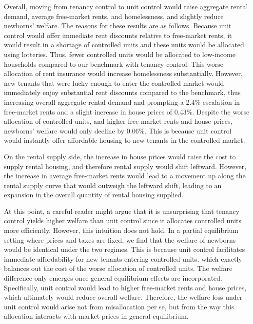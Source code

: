 \documentclass[parskip=full]{article}
\begin{document}
Overall, moving from tenancy control to unit control would raise aggregate rental demand, average free-market rents, and homelessness, and slightly reduce newborns' welfare. The reasons for these results are as follows. Because unit control would offer immediate rent discounts relative to free-market rents, it would result in a shortage of controlled units and these units would be allocated using lotteries. Thus, fewer controlled units would be allocated to low-income households compared to our benchmark with tenancy control. This worse allocation of rent insurance would increase homelessness substantially. However, new tenants that were lucky enough to enter the controlled market would immediately enjoy substantial rent discounts compared to the benchmark, thus increasing overall aggregate rental demand and prompting a 2.4\% escalation in free-market rents and a slight increase in house prices of 0.43\%. Despite the worse allocation of controlled units, and higher free-market rents and house prices, newborns' welfare would only decline by 0.06\%. This is because unit control would instantly offer affordable housing to new tenants in the controlled market. 

On the rental supply side, the increase in house prices would raise the cost to supply rental housing, and therefore rental supply would shift leftward. However, the increase in average free-market rents would lead to a movement up along the rental supply curve that would outweigh the leftward shift, leading to an expansion in the overall quantity of rental housing supplied.

At this point, a careful reader might argue that it is unsurprising that tenancy control yields higher welfare than unit control since it allocates controlled units more efficiently. However, this intuition does not hold. In a partial equilibrium setting where prices and taxes are fixed, we find that the welfare of newborns would be identical under the two regimes. This is because unit control facilitates immediate affordability for new tenants entering controlled units, which exactly balances out the cost of the worse allocation of controlled units. The welfare difference only emerges once general equilibrium effects are incorporated. Specifically, unit control would lead to higher free-market rents and house prices, which ultimately would reduce overall welfare. Therefore, the welfare loss under unit control would arise not from misallocation per se, but from the way this allocation interacts with market prices in general equilibrium.
\end{document}
